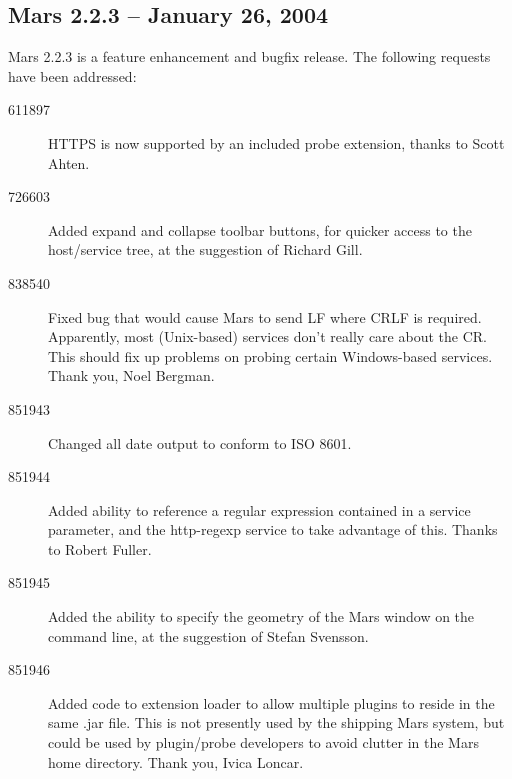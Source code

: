 \documentclass{article}
\begin{document}
\subsection{Mars 2.2.3 -- January 26, 2004}
Mars 2.2.3 is a feature enhancement and bugfix release. The following
requests have been addressed:
\begin{description}
\item[611897] HTTPS is now supported by an included probe extension,
  thanks to Scott Ahten.
\item[726603] Added expand and collapse toolbar buttons, for quicker
  access to the host/service tree, at the suggestion of Richard Gill.
\item[838540] Fixed bug that would cause Mars to send LF where CRLF is
  required. Apparently, most (Unix-based) services don't really care
  about the CR. This should fix up problems on probing certain
  Windows-based services. Thank you, Noel Bergman.
\item[851943] Changed all date output to conform to ISO 8601.
\item[851944] Added ability to reference a regular expression
  contained in a service parameter, and the http-regexp service to
  take advantage of this. Thanks to Robert Fuller.
\item[851945] Added the ability to specify the geometry of the Mars
  window on the command line, at the suggestion of Stefan Svensson.
\item[851946] Added code to extension loader to allow multiple plugins
  to reside in the same .jar file. This is not presently used by the
  shipping Mars system, but could be used by plugin/probe developers
  to avoid clutter in the Mars home directory. Thank you, Ivica
  Loncar.
\end{description}
\end{document}
